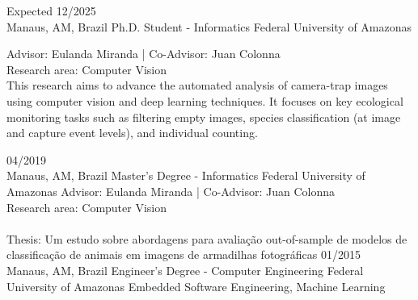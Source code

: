 \documentclass[10pt]{developercv} %
\begin{document}


\begin{entrylist}
  \entry
  {Expected 12/2025\\\footnotesize{Manaus, AM, Brazil}}
  {Ph.D. Student - Informatics}
  {Federal University of Amazonas}
  {Advisor: Eulanda Miranda | Co-Advisor: Juan Colonna\\
  Research area: Computer Vision \\

  This research aims to advance the automated analysis of camera-trap images
using computer vision and deep learning techniques. It focuses on key ecological
monitoring tasks such as filtering empty images, species classification (at
image and capture event levels), and individual counting.

  }
  \entry
  {04/2019\\\footnotesize{Manaus, AM, Brazil}}
  {Master's Degree - Informatics}
  {Federal University of Amazonas}
  {Advisor: Eulanda Miranda | Co-Advisor: Juan Colonna\\
  Research area: Computer Vision\\\\
 Thesis: Um estudo sobre abordagens para avaliação out-of-sample de modelos de
classificação de animais em imagens de armadilhas fotográficas}
  \entry
  {01/2015\\\footnotesize{Manaus, AM, Brazil}}
  {Engineer's Degree - Computer Engineering}
  {Federal University of Amazonas}
  {Embedded Software Engineering, Machine Learning}
\end{entrylist}


\end{document}
